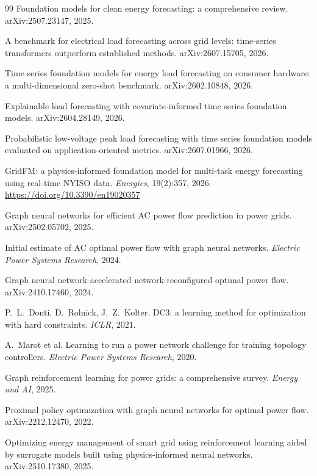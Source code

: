 \documentclass[11pt,a4paper]{article}
\begin{document}
\begin{thebibliography}{99}
Foundation models for clean energy forecasting: a comprehensive review.
arXiv:2507.23147, 2025.

A benchmark for electrical load forecasting across grid levels: time-series
transformers outperform established methods. arXiv:2607.15705, 2026.

Time series foundation models for energy load forecasting on consumer
hardware: a multi-dimensional zero-shot benchmark. arXiv:2602.10848, 2026.

Explainable load forecasting with covariate-informed time series foundation
models. arXiv:2604.28149, 2026.

Probabilistic low-voltage peak load forecasting with time series foundation
models evaluated on application-oriented metrics. arXiv:2607.01966, 2026.

GridFM: a physics-informed foundation model for multi-task energy forecasting
using real-time NYISO data. \textit{Energies}, 19(2):357, 2026.
\url{https://doi.org/10.3390/en19020357}

Graph neural networks for efficient AC power flow prediction in power grids.
arXiv:2502.05702, 2025.

Initial estimate of AC optimal power flow with graph neural networks.
\textit{Electric Power Systems Research}, 2024.

Graph neural network-accelerated network-reconfigured optimal power flow.
arXiv:2410.17460, 2024.

P.~L.~Donti, D.~Rolnick, J.~Z.~Kolter. DC3: a learning method for optimization
with hard constraints. \textit{ICLR}, 2021.

A.~Marot et al. Learning to run a power network challenge for training
topology controllers. \textit{Electric Power Systems Research}, 2020.

Graph reinforcement learning for power grids: a comprehensive survey.
\textit{Energy and AI}, 2025.

Proximal policy optimization with graph neural networks for optimal power
flow. arXiv:2212.12470, 2022.

Optimizing energy management of smart grid using reinforcement learning aided
by surrogate models built using physics-informed neural networks.
arXiv:2510.17380, 2025.


\end{thebibliography}
\end{document}
